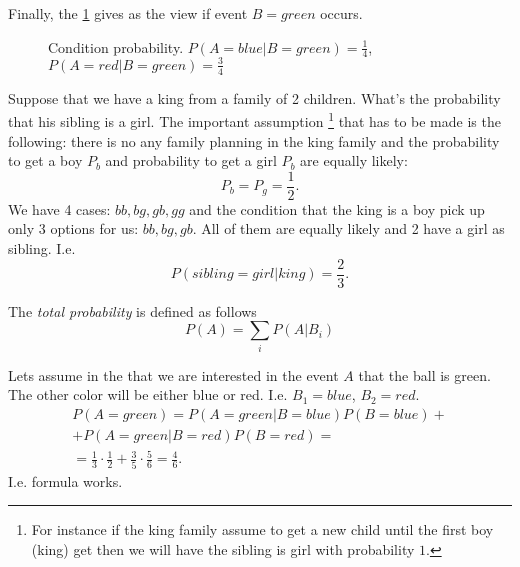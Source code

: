 \begin{example}
Finally, the \cref{fig:excondprobability_green} gives as the view if event
$B=green$ occurs. 
\begin{figure}[H]
  \centering
  \caption{Condition probability. $P(A = blue|B = green) =
    \frac{1}{4}$, $P(A = red|B = green) =
    \frac{3}{4}$} 
  \label{fig:excondprobability_green}
\end{figure}
\end{example}

\begin{example}
Suppose that we have a king from a family of 2 children. What's the
probability that his sibling is a girl. The important assumption
\footnote{
For instance if the king family assume to get a new child until the
first boy (king) get then we will have the sibling is girl with
probability $1$.
}
that
has to be made is the following: there is no any family planning in
the king family and the probability to get a boy $P_b$ and probability
to get a girl $P_b$ are equally likely:
\[
P_b = P_g = \frac{1}{2}.
\] 
We have 4 cases: $bb, bg, gb, gg$ and the condition that the king is a
boy pick up only 3 options for us: $bb, bg, gb$. All of them are
equally likely and 2 have a girl as sibling. I.e.
\[
P(sibling = girl|king) = \frac{2}{3}.
\]
\end{example}

\begin{proposition}

The \textit{total probability} is defined as follows
\[
P(A) = \sum_i P(A|B_i)
\]
\label{thm:totalprobability}
\end{proposition}

\begin{example}
Lets assume in the  that we are
interested in the event $A$ that the ball is green. The other color
will be either blue or red. I.e. $B_1 = blue$, $B_2 = red$.
\begin{eqnarray}
P(A = green) = P(A = green|B = blue) P(B = blue) +
\nonumber \\
+
P(A = green|B = red) P(B = red) =
\nonumber \\
= \frac{1}{3} \cdot \frac{1}{2} + \frac{3}{5}\cdot \frac{5}{6} = \frac{4}{6}.
\nonumber
\end{eqnarray}
I.e. formula works.
\end{example}

